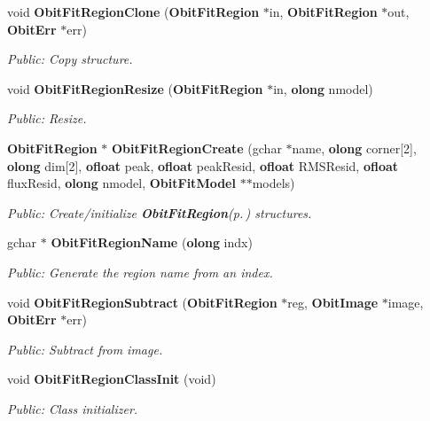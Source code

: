 \begin{CompactItemize}
void {\bf Obit\-Fit\-Region\-Clone} ({\bf Obit\-Fit\-Region} $\ast$in, {\bf Obit\-Fit\-Region} $\ast$out, {\bf Obit\-Err} $\ast$err)
\begin{CompactList}\small\item\em Public: Copy structure. \item\end{CompactList}\item 
void {\bf Obit\-Fit\-Region\-Resize} ({\bf Obit\-Fit\-Region} $\ast$in, {\bf olong} nmodel)
\begin{CompactList}\small\item\em Public: Resize. \item\end{CompactList}\item 
{\bf Obit\-Fit\-Region} $\ast$ {\bf Obit\-Fit\-Region\-Create} (gchar $\ast$name, {\bf olong} corner[2], {\bf olong} dim[2], {\bf ofloat} peak, {\bf ofloat} peak\-Resid, {\bf ofloat} RMSResid, {\bf ofloat} flux\-Resid, {\bf olong} nmodel, {\bf Obit\-Fit\-Model} $\ast$$\ast$models)
\begin{CompactList}\small\item\em Public: Create/initialize {\bf Obit\-Fit\-Region}{\rm (p.\,\pageref{structObitFitRegion})} structures. \item\end{CompactList}\item 
gchar $\ast$ {\bf Obit\-Fit\-Region\-Name} ({\bf olong} indx)
\begin{CompactList}\small\item\em Public: Generate the region name from an index. \item\end{CompactList}\item 
void {\bf Obit\-Fit\-Region\-Subtract} ({\bf Obit\-Fit\-Region} $\ast$reg, {\bf Obit\-Image} $\ast$image, {\bf Obit\-Err} $\ast$err)
\begin{CompactList}\small\item\em Public: Subtract from image. \item\end{CompactList}\item 
void {\bf Obit\-Fit\-Region\-Class\-Init} (void)
\begin{CompactList}\small\item\em Public: Class initializer. \item\end{CompactList}\end{CompactItemize}


